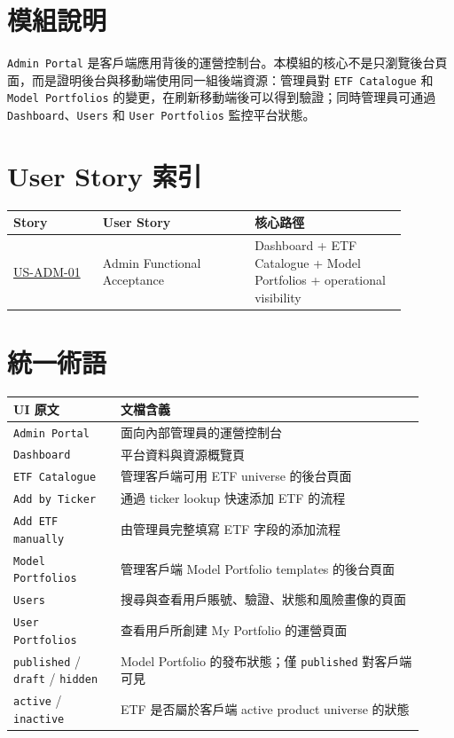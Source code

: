 \section{模組說明}
\texttt{Admin Portal} 是客戶端應用背後的運營控制台。本模組的核心不是只瀏覽後台頁面，而是證明後台與移動端使用同一組後端資源：管理員對 \texttt{ETF Catalogue} 和 \texttt{Model Portfolios} 的變更，在刷新移動端後可以得到驗證；同時管理員可通過 \texttt{Dashboard}、\texttt{Users} 和 \texttt{User Portfolios} 監控平台狀態。
\section{User Story 索引}
\begingroup
\small
\begin{longtable}{L{0.20\linewidth}L{0.34\linewidth}L{0.34\linewidth}}
\toprule
\textbf{Story} & \textbf{User Story} & \textbf{核心路徑} \\
\midrule
\hyperlink{us-adm-01}{US-ADM-01} & Admin Functional Acceptance & Dashboard + ETF Catalogue + Model Portfolios + operational visibility \\
\bottomrule
\end{longtable}
\endgroup
\section{統一術語}
\begingroup
\small
\begin{longtable}{L{0.24\linewidth}L{0.68\linewidth}}
\toprule
\textbf{UI 原文} & \textbf{文檔含義} \\
\midrule
\texttt{Admin Portal} & 面向內部管理員的運營控制台 \\
\texttt{Dashboard} & 平台資料與資源概覽頁 \\
\texttt{ETF Catalogue} & 管理客戶端可用 ETF universe 的後台頁面 \\
\texttt{Add by Ticker} & 通過 ticker lookup 快速添加 ETF 的流程 \\
\texttt{Add ETF manually} & 由管理員完整填寫 ETF 字段的添加流程 \\
\texttt{Model Portfolios} & 管理客戶端 Model Portfolio templates 的後台頁面 \\
\texttt{Users} & 搜尋與查看用戶賬號、驗證、狀態和風險畫像的頁面 \\
\texttt{User Portfolios} & 查看用戶所創建 My Portfolio 的運營頁面 \\
\texttt{published} /\allowbreak{} \texttt{draft} /\allowbreak{} \texttt{hidden} & Model Portfolio 的發布狀態；僅 \texttt{published} 對客戶端可見 \\
\texttt{active} /\allowbreak{} \texttt{inactive} & ETF 是否屬於客戶端 active product universe 的狀態 \\
\bottomrule
\end{longtable}
\endgroup
\prdhr
\hypertarget{us-adm-01}{}
